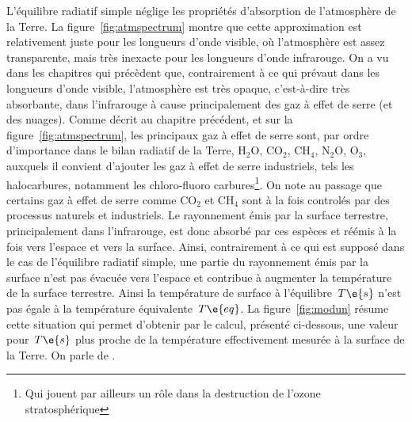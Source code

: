 \begin{finger}
\item L'équilibre radiatif simple néglige les propriétés d'absorption de l'atmosphère de la Terre. La figure~\ref{fig:atmspectrum} montre que cette approximation est relativement juste pour les longueurs d'onde visible, où l'atmosphère est assez transparente, mais très inexacte pour les longueurs d'onde infrarouge. On a vu dans les chapitres qui précèdent que, contrairement à ce qui prévaut dans les longueurs d'onde visible, l'atmosphère est très opaque, c'est-à-dire très absorbante, dans l'infrarouge à cause principalement des gaz à effet de serre (et des nuages). Comme décrit au chapitre précédent, et sur la figure~\ref{fig:atmspectrum}, les principaux gaz à effet de serre sont, par ordre d'importance dans le bilan radiatif de la Terre, H$_2$O, CO$_2$, CH$_4$, N$_2$O, O$_3$, auxquels il convient d'ajouter les gaz à effet de serre industriels, tels les halocarbures, notamment les chloro-fluoro carbures\footnote{Qui jouent par ailleurs un rôle dans la destruction de l'ozone stratosphérique}. On note au passage que certains gaz à effet de serre comme CO$_2$ et CH$_4$ sont à la fois controlés par des processus naturels et industriels. Le rayonnement émis par la surface terrestre, principalement dans l'infrarouge, est donc absorbé par ces espèces et réémis à la fois vers l'espace et vers la surface. Ainsi, contrairement à ce qui est supposé dans le cas de l'équilibre radiatif simple, une partie du rayonnement émis par la surface n'est pas évacuée vers l'espace et contribue à augmenter la température de la surface terrestre. Ainsi la température de surface à l'équilibre~$T\e{s}$ n'est pas égale à la température équivalente~$T\e{eq}$. La figure~\ref{fig:modun} résume cette situation qui permet d'obtenir par le calcul, présenté ci-dessous, une valeur pour~$T\e{s}$ plus proche de la température effectivement mesurée à la surface de la Terre. On parle de .
\end{finger}

